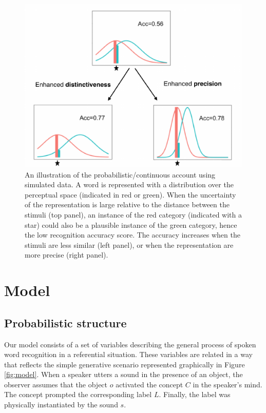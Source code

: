 \documentclass[10pt, letterpaper]{article}
\newenvironment{CodeChunk}{}{}
\begin{document}
\begin{CodeChunk}
\begin{figure}[H]

{\centering \includegraphics{figs/illus-1} 

}

\caption{\label{fig:illus} An illustration of the probabilistic/continuous account using simulated data. A word is represented with a distribution over the perceptual space (indicated in red or green). When the uncertainty of the representation is large relative to the distance between the stimuli (top panel), an instance of the red category (indicated with a star) could also be a plausible instance of the green category, hence the low recognition accuracy score. The accuracy increases when the stimuli are less similar (left panel), or when the representation are more precise (right panel).}\label{fig:illus}
\end{figure}
\end{CodeChunk}

\section{Model}\label{model}

\subsection{Probabilistic structure}\label{probabilistic-structure}

Our model consists of a set of variables describing the general process
of spoken word recognition in a referential situation. These variables
are related in a way that reflects the simple generative scenario
represented graphically in Figure \ref{fig:model}. When a speaker utters
a sound in the presence of an object, the observer assumes that the
object \(o\) activated the concept \(C\) in the speaker's mind. The
concept prompted the corresponding label \(L\). Finally, the label was
physically instantiated by the sound \(s\).
\end{document}
